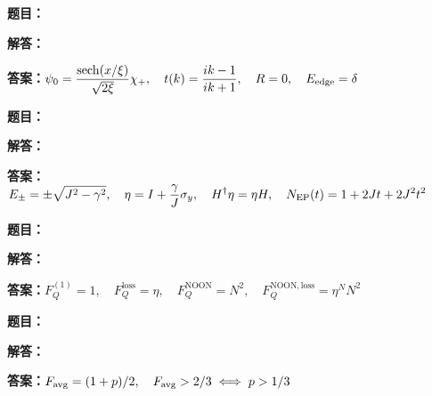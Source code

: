 \documentclass[lang=cn,color=blue,11pt]{elegantbook}
\begin{document}
\par
\noindent\textbf{题目：}
\par\noindent\textbf{解答：}
\par\noindent\textbf{答案：}\(\displaystyle \psi_0=\frac{\operatorname{sech}(x/\xi)}{\sqrt{2\xi}}\chi_+,\quad t(k)=\frac{ik-1}{ik+1},\quad R=0,\quad E_{\rm edge}=\delta\)\par
\par\smallskip\noindent\hrulefill\par\medskip
{}\par
\noindent\textbf{题目：}
\par\noindent\textbf{解答：}
\par\noindent\textbf{答案：}\(\displaystyle E_\pm=\pm\sqrt{J^2-\gamma^2},\quad \eta=I+\frac{\gamma}{J}\sigma_y,\quad H^\dagger\eta=\eta H,\quad N_{\rm EP}(t)=1+2Jt+2J^2t^2\)\par
\par\smallskip\noindent\hrulefill\par\medskip
{}\par
\noindent\textbf{题目：}
\par\noindent\textbf{解答：}
\par\noindent\textbf{答案：}\(\displaystyle F_Q^{(1)}=1,\quad F_Q^{\mathrm{loss}}=\eta,\quad F_Q^{\mathrm{NOON}}=N^2,\quad F_Q^{\mathrm{NOON,loss}}=\eta^N N^2\)\par
\par\smallskip\noindent\hrulefill\par\medskip
{}\par
\noindent\textbf{题目：}
\par\noindent\textbf{解答：}
\par\noindent\textbf{答案：}\(\displaystyle F_{\rm avg}=(1+p)/2,\quad F_{\rm avg}>2/3\iff p>1/3\)\par
\end{document}
